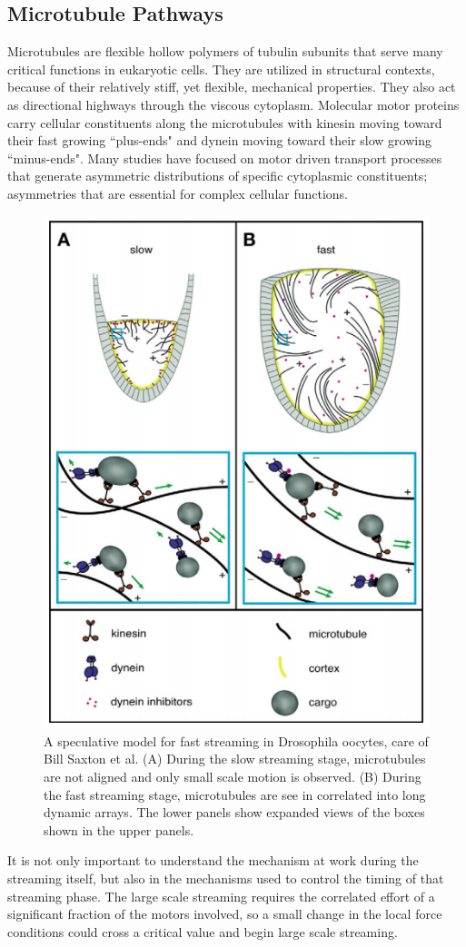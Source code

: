 \documentclass[11pt]{ucthesis}
\begin{document}
\subsection{Microtubule Pathways}
Microtubules are flexible hollow polymers of tubulin subunits that
serve many critical functions in eukaryotic cells. They are utilized
in structural contexts, because of their relatively stiff, yet flexible,
mechanical properties.  They also act as directional highways through the
viscous cytoplasm. Molecular motor proteins carry cellular constituents
along the microtubules with kinesin moving toward their fast growing
``plus-ends" and dynein moving toward their slow growing ``minus-ends".
Many studies have focused on motor driven transport processes that
generate asymmetric distributions of specific cytoplasmic constituents;
asymmetries that are essential for complex cellular functions. 

\begin{figure}[htp]
\begin{center}
\includegraphics[width=0.5\hsize]{biomodel.png}
\caption{ 
A speculative model for fast streaming in Drosophila oocytes, care of Bill Saxton et al. (A) During the slow streaming stage, microtubules are not aligned and only small scale motion is observed. (B) During the fast streaming stage, microtubules are see in correlated into long dynamic arrays. The lower panels show expanded views of the boxes shown in the upper panels. 
}
\label{fig:biomodel}
\end{center}
\end{figure}



It is not only important to understand the mechanism at work during the streaming itself, but also in the mechanisms used to control the timing of that streaming phase.
The large scale streaming requires the correlated effort of a significant fraction of the motors involved, so a small change in the local force conditions could cross a critical value and begin large scale streaming.
\end{document}
